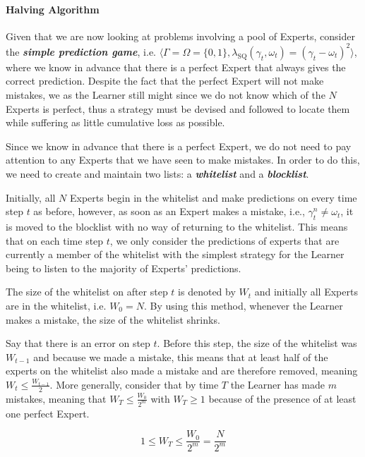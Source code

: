 \paragraph{Halving Algorithm}\label{paragraph:halving_algorithm}
Given that we are now looking at problems involving a pool of Experts, consider the \textbf{\textit{simple prediction game}}, i.e. $\langle \Gamma = \Omega = \{0, 1\}, \lambda_\text{SQ}(\gamma_t, \omega_t) = {(\gamma_t - \omega_t)}^2 \rangle$, where we know in advance that there is a perfect Expert that always gives the correct prediction. Despite the fact that the perfect Expert will not make mistakes, we as the Learner still might since we do not know which of the $N$ Experts is perfect, thus a strategy must be devised and followed to locate them while suffering as little cumulative loss as possible.

Since we know in advance that there is a perfect Expert, we do not need to pay attention to any Experts that we have seen to make mistakes. In order to do this, we need to create and maintain two lists: a \textbf{\textit{whitelist}} and a \textbf{\textit{blocklist}}.

Initially, all $N$ Experts begin in the whitelist and make predictions on every time step $t$ as before, however, as soon as an Expert makes a mistake, i.e., $\gamma^n_t \neq \omega_t$, it is moved to the blocklist with no way of returning to the whitelist. This means that on each time step $t$, we only consider the predictions of experts that are currently a member of the whitelist with the simplest strategy for the Learner being to listen to the majority of Experts' predictions.

The size of the whitelist on after step $t$ is denoted by $W_t$ and initially all Experts are in the whitelist, i.e. $W_0 = N$. By using this method, whenever the Learner makes a mistake, the size of the whitelist shrinks.

Say that there is an error on step $t$. Before this step, the size of the whitelist was $W_{t-1}$ and because we made a mistake, this means that at least half of the experts on the whitelist also made a mistake and are therefore removed, meaning $W_{t} \leq \frac{W_{t-1}}{2}$. More generally, consider that by time $T$ the Learner has made $m$ mistakes, meaning that $W_T \leq \frac{W_0}{2^m}$ with $W_T \geq 1$ because of the presence of at least one perfect Expert.

\begin{equation}
    1 \leq W_T \leq \frac{W_0}{2^m} = \frac{N}{2^m}
\end{equation}

